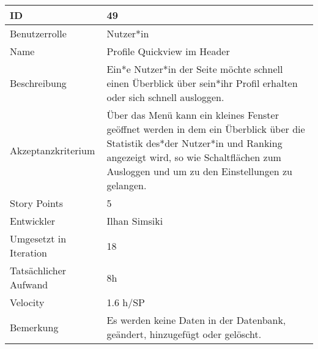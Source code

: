\begin{tabularx}{\textwidth}{|p{}|X|}
	\hline
	ID & 49\\
	\hline
	Benutzerrolle & Nutzer*in\\
	\hline
	Name & Profile Quickview im Header\\
	\hline
	Beschreibung & Ein*e Nutzer*in der Seite möchte schnell einen Überblick über sein*ihr Profil erhalten oder sich schnell ausloggen.\\
	\hline
	Akzeptanzkriterium & Über das Menü kann ein kleines Fenster geöffnet werden in dem ein Überblick über die Statistik des*der Nutzer*in und Ranking angezeigt wird, so wie Schaltflächen zum Ausloggen und um zu den Einstellungen zu gelangen.\\
	\hline
	Story Points & 5\\
	\hline
	Entwickler & Ilhan Simsiki\\
	\hline
	Umgesetzt in Iteration & 18\\
	\hline
	Tatsächlicher Aufwand & 8h\\
	\hline
	Velocity & 1.6 h/SP \\
	\hline
	Bemerkung & Es werden keine Daten in der Datenbank, geändert, hinzugefügt oder gelöscht.\\
	\hline
\end{tabularx}
\vspace{20pt}
